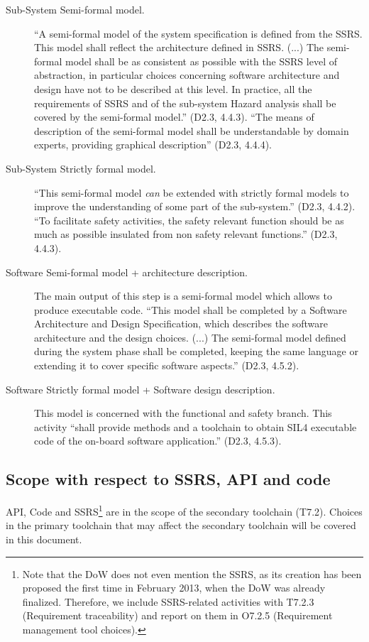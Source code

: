 \begin{description}
  \item [Sub-System Semi-formal model.]  ``A semi-formal model of the system specification is defined from the SSRS. This model shall reflect the architecture defined in SSRS. (...) The semi-formal model shall be as consistent as possible with the SSRS level of abstraction, in particular choices concerning
software architecture and design have not to be described at this level. In practice, all the requirements of SSRS and of the sub-system Hazard analysis shall be covered by the semi-formal model.'' (D2.3, 4.4.3).  ``The means of description of the semi-formal model shall be understandable by domain experts, providing graphical description'' (D2.3, 4.4.4).

  \item [Sub-System Strictly formal model.] ``This semi-formal model \emph{can} be extended with strictly formal models to improve the understanding of some part of the sub-system.'' (D2.3, 4.4.2).  ``To facilitate safety activities, the safety relevant function should be as much as possible insulated from non safety relevant functions.'' (D2.3, 4.4.3).

  \item [Software Semi-formal model + architecture description.] The main output of this step is a semi-formal model which allows to produce executable code. ``This model shall be completed by a Software Architecture and Design Specification, which describes the software architecture and the design choices. (...) The semi-formal model defined during the system phase shall be completed, keeping the same language or extending it to cover specific software aspects.'' (D2.3, 4.5.2).

  \item [Software Strictly formal model + Software design description.]  This model is concerned with the functional and safety branch.  This activity ``shall provide methods and a toolchain to obtain SIL4 executable code of the on-board software application.'' (D2.3, 4.5.3).

\end{description}


\subsection{Scope with respect to SSRS, API and code}

API, Code and SSRS\footnote{Note that the DoW does not even mention the SSRS, as its creation has been proposed the first time in February 2013, when the DoW was already finalized.  Therefore, we include SSRS-related activities with T7.2.3 (Requirement traceability) and report on them in O7.2.5 (Requirement management tool choices).}  are in the scope of the secondary toolchain (T7.2).  Choices in the primary toolchain that may affect the secondary toolchain will be covered in this document.

